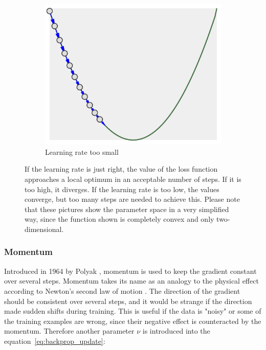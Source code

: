 \begin{figure}
\begin{subfigure}[b]{0.3\textwidth}
        \includegraphics[width=\textwidth]{images/lr_too_low.png}
        \caption{Learning rate too small}
        \label{fig:lr_too-low}
    \end{subfigure}
    \caption[Learning rate]{If the learning rate is just right, the value of the loss function approaches a local optimum in an acceptable number of steps.
    If it is too high, it diverges.
    If the learning rate is too low, the values converge, but too many steps are needed to achieve this.
    Please note that these pictures show the parameter space in a very simplified way, since the function shown is completely convex and only two-dimensional.}
    \label{fig:learning_rate}
\end{figure}

\subsubsection{Momentum}

Introduced in 1964 by Polyak \cite{Polyak1964}, momentum is used to keep the gradient constant over several steps.
Momentum takes its name as an analogy to the physical effect according to Newton's second law of motion \cite[p.12]{Newton1687}.
The direction of the gradient should be consistent over several steps, and it would be strange if the direction made sudden shifts during training.
This is useful if the data is "noisy" or some of the training examples are wrong, since their negative effect is counteracted by the momentum.
Therefore another parameter $\nu$ is introduced into the equation~\eqref{eq:backprop_update}:

